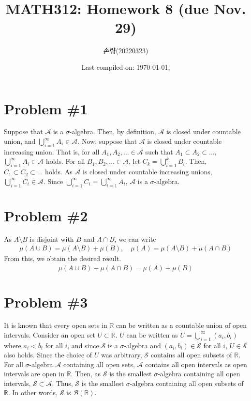 \documentclass{scrartcl}
\title{MATH312: Homework 8 (due Nov. 29)}
\author{손량(20220323)}
\date{Last compiled on: \today, \currenttime}
\begin{document}
\maketitle

\section{Problem \#1}
Suppose that \(\mathcal{A}\) is a \(\sigma\)-algebra. Then, by definition,
\(\mathcal{A}\) is closed under countable union, and \(\bigcup^\infty_{i = 1}
A_i \in \mathcal{A}\). Now, suppose that \(\mathcal{A}\) is closed under
countable increasing union. That is, for all \(A_1, A_2, \dots \in
\mathcal{A}\) such that \(A_1 \subset A_2 \subset \dots\), \(\bigcup^\infty_{i
= 1} A_i \in \mathcal{A}\) holds. For all \(B_1, B_2, \dots \in \mathcal{A}\),
let \(C_k = \bigcup^k_{i = 1} B_i\). Then, \(C_1 \subset C_2 \subset \dots\)
holds. As \(\mathcal{A}\) is closed under countable increasing unions,
\(\bigcup^\infty_{i = 1} C_i \in \mathcal{A}\). Since \(\bigcup^\infty_{i = 1}
C_i = \bigcup^\infty_{i = 1} A_i\), \(\mathcal{A}\) is a \(\sigma\)-algebra.

\section{Problem \#2}
As \(A \setminus B\) is disjoint with \(B\) and \(A \cap B\), we can write
\begin{align*}
  \mu(A \cup B)
  = \mu(A \setminus B) + \mu(B), \quad
  \mu(A)
  = \mu(A \setminus B) + \mu(A \cap B)
\end{align*}
From this, we obtain the desired result.
\begin{align*}
  \mu(A \cup B) + \mu(A \cap B)
  = \mu(A) + \mu(B)
\end{align*}

\section{Problem \#3}
It is known that every open sets in \(\mathbb{R}\) can be written as a
countable union of open intervals. Consider an open set \(U \subset
\mathbb{R}\). \(U\) can be written as \(U = \bigcup^\infty_{i = 1} (a_i,
b_i)\) where \(a_i < b_i\) for all \(i\), and since \(\mathcal{S}\) is a
\(\sigma\)-algebra and \((a_i, b_i) \in \mathcal{S}\) for all \(i\), \(U \in
\mathcal{S}\) also holds. Since the choice of \(U\) was arbitrary,
\(\mathcal{S}\) contains all open subsets of \(\mathbb{R}\). For all
\(\sigma\)-algebra \(\mathcal{A}\) containing all open sets, \(\mathcal{A}\)
contains all open intervals as open intervals are open in \(\mathbb{R}\). Then,
as \(\mathcal{S}\) is the smallest \(\sigma\)-algebra containing all open
intervals, \(\mathcal{S} \subset \mathcal{A}\). Thus, \(\mathcal{S}\) is the
smallest \(\sigma\)-algebra containing all open subsets of \(\mathbb{R}\). In
other words, \(\mathcal{S}\) is \(\mathcal{B}(\mathbb{R})\).
\end{document}
